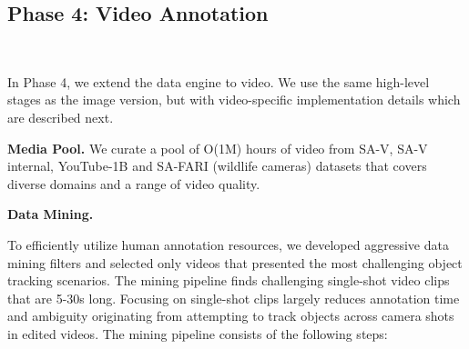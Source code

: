 \documentclass[]{fairmeta}
\renewcommand{\paragraph}[1]{%
	\noindent\textbf{#1.}\noindent\xspace%
}
\begin{document}
	

	


	
	
	
	
	
	
	


	






\subsection{Phase 4: Video Annotation}~\label{appendix:vde}

In Phase 4, we extend the data engine to video. We use the same high-level stages as the image version, but with video-specific implementation details which are described next. 

\paragraph{Media Pool} We curate a pool of O(1M) hours of video from SA-V, SA-V internal, YouTube-1B and SA-FARI (wildlife cameras) datasets that covers diverse domains and a range of video quality.



\paragraph{Data Mining}
To efficiently utilize human annotation resources, we developed aggressive data mining filters and selected only videos that presented the most challenging object tracking scenarios. The mining pipeline finds challenging single-shot video clips that are 5-30s long. Focusing on single-shot clips largely reduces annotation time and ambiguity originating from attempting to track objects across camera shots in edited videos. The mining pipeline consists of the following steps:
\end{document}
